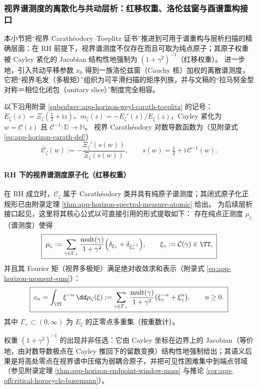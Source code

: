 \subsubsection{视界谱测度的离散化与共动层析：红移权重、洛伦兹窗与酉谱重构接口}\label{subsubsec:xi-horizon-spectral-measure-tomography}
本小节把“视界 Carath\'eodory--Toeplitz 证书”推进到可用于谱重构与层析扫描的精确层面：在 RH 前提下，视界谱测度不仅存在而且可取为纯点原子；其原子权重被 Cayley 紧化的 Jacobian 结构性地强制为 \((1+\gamma^{2})^{-1}\)（红移权重）。
进一步地，引入共动平移参数 \(x_0\) 得到一族洛伦兹窗（Cauchy 核）加权的离散谱测度，它把“视界毛发（多极矩）”组织为可平滑扫描的矩序列族，并与文稿的“拉马努金型对称＝相位化闭包（unitary slice）”制度完全相容。
\par
以下沿用附录 \ref{subsubsec:app-horizon-weyl-carath-toeplitz} 的记号：\(E_{\zeta}(z)=\Xi_{\zeta}(\tfrac12+\mathrm{i}z)\)、\(m_{\zeta}(z)=-E_{\zeta}'(z)/E_{\zeta}(z)\)，Cayley 紧化为 \(w=\mathcal{C}(z)\) 且 \(\mathcal{C}^{-1}:\mathbb{D}\to\mathbb{H}\)。
视界 Carath\'eodory 对数导数函数为（见附录式 \eqref{eq:app-horizon-carath-def}）
\[
  \mathscr{C}_{\zeta}(w):=-\frac{\Xi_{\zeta}'(s(w))}{\Xi_{\zeta}(s(w))},
  \qquad s(w)=\tfrac12+\mathrm{i}\,\mathcal{C}^{-1}(w).
\]

\paragraph{RH 下的视界谱测度原子化（红移权重）}
在 RH 成立时，\(\mathscr{C}_{\zeta}\) 属于 Carath\'eodory 类并具有纯原子谱测度；其闭式原子化正规形已由附录定理 \ref{thm:app-horizon-spectral-measure-atomic} 给出。
为后续层析接口起见，这里将其核心公式以可直接引用的形式提取如下：
存在纯点正测度 \(\mu_{\zeta}\)（谱测度）使得
\begin{equation}\label{eq:xi-horizon-mu-atomic-recall}
\boxed{\;
\mu_{\zeta}
:=
\sum_{\gamma\in\Gamma_+}\frac{\mathrm{mult}(\gamma)}{1+\gamma^2}\Bigl(\delta_{\xi_{\gamma}}+\delta_{\xi_{\gamma}^{-1}}\Bigr),
\qquad \xi_{\gamma}:=\mathcal{C}(\gamma)\in\TT,
\;}
\end{equation}
并且其 Fourier 矩（视界多极矩）满足绝对收敛求和表示（附录式 \eqref{eq:app-horizon-moment-sum}）：
\begin{equation}\label{eq:xi-horizon-moment-sum-recall}
\boxed{\;
c_n=\int_{\TT}\xi^{-n}\,\dd\mu_{\zeta}(\xi)
:=
\sum_{\gamma\in\Gamma_+}\frac{\mathrm{mult}(\gamma)}{1+\gamma^2}\bigl(\xi_{\gamma}^{-n}+\xi_{\gamma}^{n}\bigr),
\qquad n\ge 0.
\;}
\end{equation}
其中 \(\Gamma_+\subset(0,\infty)\) 为 \(E_{\zeta}\) 的正零点多重集（按重数计）。
\par
权重 \((1+\gamma^2)^{-1}\) 的出现并非任选：它由 Cayley 坐标在边界上的 Jacobian（等价地，由对数导数极点在 Cayley 推回下的留数变换）结构性地强制给出；其语义后果是将高处零点在视界谱中压缩为弱耦合原子，并把可见性困难集中到端点邻域（参见附录定理 \ref{thm:app-horizon-endpoint-window-mass} 与推论 \ref{cor:app-offcritical-horocycle-busemann}）。

